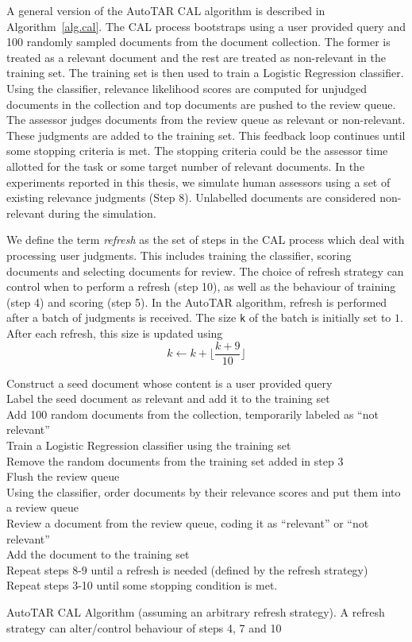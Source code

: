A general version of the AutoTAR CAL algorithm is described in
Algorithm~\ref{alg.cal}. The CAL process bootstraps using a user provided query
and 100 randomly sampled documents from the document collection. The former is
treated as a relevant document and the rest are treated as non-relevant in the
training set. The training set is then used to train a Logistic Regression
classifier. Using the classifier, relevance likelihood scores are computed
for unjudged documents in the collection and top documents are pushed to
the review queue. The assessor judges documents from the review queue as
relevant or non-relevant. These judgments are added to the training set. This
feedback loop continues until some stopping criteria is met. The stopping
criteria could be the assessor time allotted for the task or some target number of
relevant documents. In the experiments reported in this thesis, we simulate
human assessors using a set of existing relevance judgments (Step 8). Unlabelled
documents are considered non-relevant during the simulation.

We define the term \textit{refresh} as the set of steps in the CAL process which
deal with processing user judgments. This includes training the classifier,
scoring documents and selecting documents for review. The choice of refresh
strategy can control when to perform a refresh (step 10), as well as the
behaviour of training (step 4) and scoring (step 5). In the AutoTAR algorithm,
refresh is performed after a batch of judgments is received. The size \texttt{k} of the
batch is initially set to $1$. After each refresh, this size is updated using
\begin{equation*}
k \leftarrow k + \lfloor\frac{k + 9}{10}\rfloor
\end{equation*}

\begin{algorithm}[]
Construct a seed document whose content is a user provided query\\
Label the seed document as relevant and add it to the training set \\
Add 100 random documents from the collection, temporarily labeled as ``not
relevant'' \\
Train a Logistic Regression classifier using the training set \\
Remove the random documents from the training set added in step 3 \\
Flush the review queue \\
Using the classifier, order documents by their relevance scores and put them
into a review queue \\ Review a document from the review queue, coding it as
``relevant'' or ``not relevant'' \\
Add the document to the training set \\
Repeat steps 8-9 until a refresh is needed (defined by the refresh strategy) \\
Repeat steps 3-10 until some stopping condition is met.
\caption{AutoTAR CAL Algorithm (assuming an arbitrary refresh strategy). A refresh
strategy can alter/control behaviour of steps 4, 7 and 10}
\label{alg.cal}
\end{algorithm}

